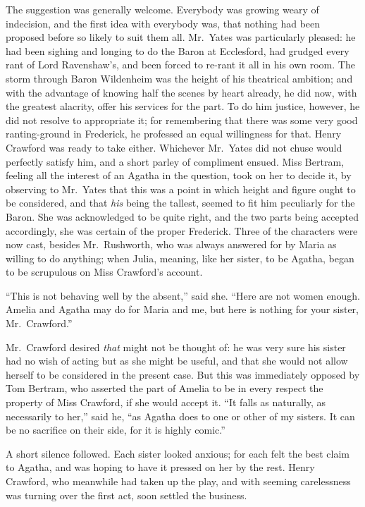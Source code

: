\documentclass{article}
\begin{document}
The suggestion was generally welcome.  Everybody was growing
weary of indecision, and the first idea with everybody was,
that nothing had been proposed before so likely to suit
them all.  Mr.\ Yates was particularly pleased:  he had
been sighing and longing to do the Baron at Ecclesford,
had grudged every rant of Lord Ravenshaw's, and been forced
to re-rant it all in his own room.  The storm through Baron
Wildenheim was the height of his theatrical ambition;
and with the advantage of knowing half the scenes by
heart already, he did now, with the greatest alacrity,
offer his services for the part.  To do him justice,
however, he did not resolve to appropriate it;
for remembering that there was some very good ranting-ground
in Frederick, he professed an equal willingness for that.
Henry Crawford was ready to take either.  Whichever Mr.\ Yates
did not chuse would perfectly satisfy him, and a short
parley of compliment ensued.  Miss Bertram, feeling all
the interest of an Agatha in the question, took on her
to decide it, by observing to Mr.\ Yates that this was a
point in which height and figure ought to be considered,
and that \emph{his} being the tallest, seemed to fit him
peculiarly for the Baron.  She was acknowledged to be
quite right, and the two parts being accepted accordingly,
she was certain of the proper Frederick.  Three of the
characters were now cast, besides Mr.\ Rushworth, who was
always answered for by Maria as willing to do anything;
when Julia, meaning, like her sister, to be Agatha,
began to be scrupulous on Miss Crawford's account.

``This is not behaving well by the absent,'' said she.
``Here are not women enough.  Amelia and Agatha may do
for Maria and me, but here is nothing for your sister,
Mr.\ Crawford.''

Mr.\ Crawford desired \emph{that} might not be thought of:
he was very sure his sister had no wish of acting
but as she might be useful, and that she would not
allow herself to be considered in the present case.
But this was immediately opposed by Tom Bertram,
who asserted the part of Amelia to be in every respect
the property of Miss Crawford, if she would accept it.
``It falls as naturally, as necessarily to her,'' said he,
``as Agatha does to one or other of my sisters.  It can be no
sacrifice on their side, for it is highly comic.''

A short silence followed.  Each sister looked anxious;
for each felt the best claim to Agatha, and was hoping
to have it pressed on her by the rest.  Henry Crawford,
who meanwhile had taken up the play, and with seeming
carelessness was turning over the first act, soon settled
the business.
\end{document}
